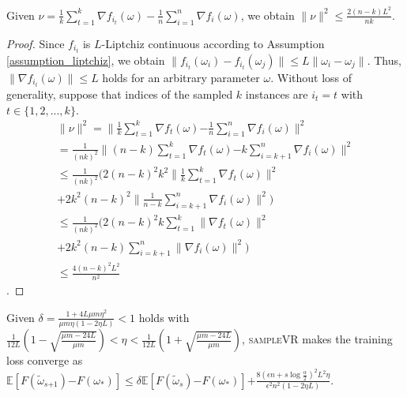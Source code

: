 \documentclass[letterpaper]{article}
\begin{document}
\begin{Lemma}
\label{lemma_nu}
Given $\nu = \frac{1}{k}\sum\limits_{t=1}^k  \nabla f_{i_t}(\omega) - \frac{1}{n}\sum\limits_{i=1}^n \nabla f_i(\omega)$, we obtain
$\parallel \nu  \parallel^2 \le \frac{2(n-k)L^2}{nk}$.
\end{Lemma}
\begin{proof}
Since $f_{i_t}$ is $L$-Liptchiz continuous according to Assumption \ref{assumption_liptchiz},  we obtain $\parallel  f_{i_t}(\omega_i) - f_{i_t}(\omega_j)  \parallel \le L \parallel \omega_i - \omega_j    \parallel$. Thus, $\parallel \nabla f_{i_t}(\omega) \parallel \le L$ holds for an arbitrary parameter $\omega$.
Without loss of generality, suppose that indices of the sampled $k$ instances are $i_t=t$ with $t\in\{1,2, ..., k\}$.
\begin{equation}
\begin{array}{ll}
\parallel \nu  \parallel^2 
=\parallel \frac{1}{k}\sum\limits_{t=1}^k  \nabla f_{t}(\omega) \mathrm{-} \frac{1}{n}\sum\limits_{i=1}^n \nabla f_i(\omega) \parallel^2    \\
=\frac{1}{(nk)^2}\parallel (n-k)\sum\limits_{t=1}^k  \nabla f_{t}(\omega) \mathrm{-} k\sum\limits_{i=k+1}^n \nabla f_i(\omega) \parallel^2\\
\le \frac{1}{(nk)^2} ( 2(n-k)^2 k^2 \parallel \frac{1}{k} \sum\limits_{t=1}^k \nabla f_{t}(\omega)\parallel^2 \\
+2k^2 (n-k)^2 \parallel \frac{1}{n-k}\sum\limits_{i=k+1}^n \nabla f_{i}(\omega) \parallel^2 )     \\
\le \frac{1}{(nk)^2} ( 2(n-k)^2 k \sum\limits_{t=1}^k\parallel  \nabla f_{t}(\omega)\parallel^2 \\
+2k^2 (n-k) \sum\limits_{i=k+1}^n \parallel  \nabla f_{i}(\omega) \parallel^2 )     \\
\le \frac{4(n-k)^2L^2}{n^2}
\end{array} 
\end{equation}.  
\end{proof}
\begin{Theorem}
\label{Theorem_converge}
Given $\delta=\frac{1+4L\mu m \eta^2}{  \mu m \eta (1-2\eta L)  } < 1$ holds with $\frac{1}{12L}\left( 1- \sqrt{\frac{\mu m - 24L}{\mu m}} \right) < \eta < \frac{1}{12L}\left( 1+ \sqrt{\frac{\mu m - 24L}{\mu m}} \right)$, \textsc{sampleVR} makes the training loss converge as
$\mathbb{E}[F(\tilde{\omega}_{s\mathrm{+}1}) \mathrm{-} F(\omega_\ast)]  \le \delta \mathbb{E}[F(\tilde{\omega}_s)\mathrm{-}F(\omega_\ast)] \mathrm{+} \frac{8(\epsilon n+s\log\frac{\alpha}{2})^2L^2\eta}{\epsilon^2n^2(1-2\eta L)}$.
\end{Theorem}
\end{document}
